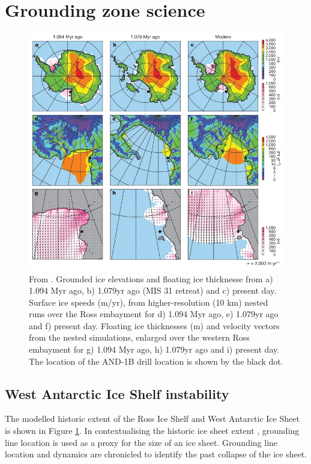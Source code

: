 \newpage
\section{Grounding zone science} \label{sec:grounding_zone_science}


\begin{figure}[!ht]
\centering
\includegraphics[width=1\textwidth]{chapters/1/pollard.png}
\caption[Ross Ice Shelf Extent]{From \cite{pollard2009modelling}.
Grounded ice elevations and floating ice thicknesse from a) 1.094 Myr ago, b) 1.079yr ago (MIS 31 retreat) and c) present day.
Surface ice speeds (m/yr), from higher-resolution (10 km) nested runs over the Ross embayment for d) 1.094 Myr ago, e) 1.079yr ago and f) present day.
Floating ice thicknesses (m) and velocity vectors from the nested simulations, enlarged over the western Ross embayment for  g) 1.094 Myr ago, h) 1.079yr ago and i) present day.
The location of the AND-1B drill location is shown by the black dot.}
\label{fig:pollard}
\end{figure}  

\subsection{West Antarctic Ice Shelf instability}

The modelled historic extent of the Ross Ice Shelf and West Antarctic Ice Sheet is shown in Figure \ref{fig:pollard}.
In contextualising the historic ice sheet extent \cite[e.g][]{naish2009obliquity,pollard2009modelling}, grounding line location is used as a proxy for the size of an ice sheet. Grounding line location and dynamics are chronicled to identify the past collapse of the ice sheet. 


